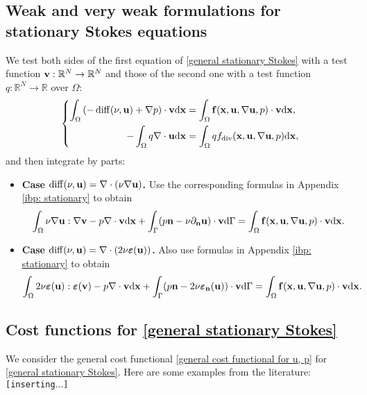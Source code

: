 \documentclass[oneside,11pt]{book}
\numberwithin{equation}{section}
\begin{document}
\subsection{Weak and very weak formulations for stationary Stokes equations}
We test both sides of the first equation of \eqref{general stationary Stokes} with a test function ${\bf v}:\mathbb{R}^N\to\mathbb{R}^N$ and those of the second one with a test function $q:\mathbb{R}^N\to\mathbb{R}$ over $\Omega$:
\begin{equation*}
    \left\{\begin{split}
        \int_\Omega \left(-\operatorname{diff}(\nu,{\bf u}) + \nabla p\right)\cdot{\bf v}{\rm d}{\bf x} &= \int_\Omega {\bf f}({\bf x},{\bf u},\nabla{\bf u},p)\cdot{\bf v}{\rm d}{\bf x},\\
        -\int_\Omega q\nabla\cdot{\bf u}{\rm d}{\bf x} &= \int_\Omega qf_{\rm div}({\bf x},{\bf u},\nabla{\bf u},p){\rm d}{\bf x},
    \end{split}\right.
\end{equation*}
and then integrate by parts:
\begin{itemize}
    \item \textbf{Case $\operatorname{diff}(\nu,{\bf u}) = \nabla\cdot(\nu\nabla{\bf u})$.} Use the corresponding formulas in Appendix \ref{ibp: stationary} to obtain
    \begin{align*}
        \int_\Omega \nu\nabla{\bf u}:\nabla{\bf v} - p\nabla\cdot{\bf v}{\rm d}{\bf x} + \int_\Gamma (p{\bf n} - \nu\partial_{\bf n}{\bf u})\cdot{\bf v}{\rm d}\Gamma = \int_\Omega {\bf f}({\bf x},{\bf u},\nabla{\bf u},p)\cdot{\bf v}{\rm d}{\bf x}.
    \end{align*} 
    \item \textbf{Case $\operatorname{diff}(\nu,{\bf u}) = \nabla\cdot(2\nu\boldsymbol{\varepsilon}({\bf u}))$.} Also use formulas in Appendix \ref{ibp: stationary} to obtain
    \begin{align*}
        \int_\Omega 2\nu\boldsymbol{\varepsilon}({\bf u}):\boldsymbol{\varepsilon}({\bf v}) - p\nabla\cdot{\bf v}{\rm d}{\bf x} + \int_\Gamma (p{\bf n} - 2\nu\boldsymbol{\varepsilon}_{\bf n}({\bf u}))\cdot{\bf v}{\rm d}\Gamma = \int_\Omega {\bf f}({\bf x},{\bf u},\nabla{\bf u},p)\cdot{\bf v}{\rm d}{\bf x}.
    \end{align*}
\end{itemize}

\subsection{Cost functions for \eqref{general stationary Stokes}}
We consider the general cost functional \eqref{general cost functional for u, p} for \eqref{general stationary Stokes}. Here are some examples from the literature: \texttt{[inserting$\ldots$]}
\end{document}
